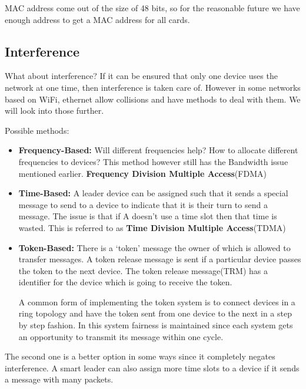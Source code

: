 \documentclass[12pt]{article}
\newcommand{\tbox}[1]{\noindent\fbox{\parbox{\textwidth}{#1}}}
\begin{document}
MAC address come out of the size of 48 bits, so for the reasonable future we have enough address to get a MAC
address for all cards. 


\subsection{Interference}

What about interference? If it can be ensured that only one device uses the network at one time, then 
interference is taken care of. However in some networks based on WiFi, ethernet allow collisions and have methods to 
deal with them. We will look into those further. 

Possible methods:
\begin{itemize}
    \item \textbf{Frequency-Based:} Will different frequencies help? How to allocate different frequencies to devices? This method however still has the Bandwidth issue mentioned earlier. \textbf{Frequency Division Multiple Access}(FDMA)
    \item \textbf{Time-Based:} A leader device can be assigned such that it sends a special message to send to a device
    to indicate that it is their turn to send a message. The issue is that 
    if A doesn't use a time slot then that time is wasted. This is referred to as \textbf{Time Division Multiple Access}(TDMA)
    \item \textbf{Token-Based:} There is a `token' message the owner of which is allowed to transfer messages. A 
    token release message is sent if a particular device passes the token to the next device. The token release message(TRM) has 
    a identifier for the device which is going to receive the token. 

    A common form of implementing the token system is to connect devices in a ring topology and have the 
    token sent from one device to the next in a step by step fashion. In this system fairness is maintained since 
    each system gets an opportunity to transmit its message within one cycle. 

\end{itemize}

The second one is a better option in some ways since it completely negates interference. A smart leader can also 
assign more time slots to a device if it sends a message with many packets.



\noindent\tbox{
    \begin{center}
    \textbf{\Huge Lecture 14}
    \end{center}
}
\end{document}
